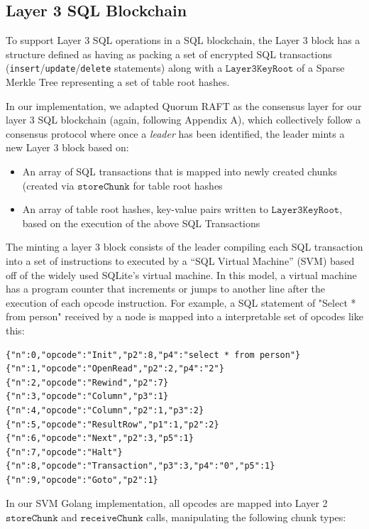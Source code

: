 \documentclass{article}
\begin{document}
\subsection{Layer 3 SQL Blockchain}

To support Layer 3 SQL operations in a SQL blockchain, the Layer 3 block has a  structure defined as having as packing a set of encrypted SQL transactions ({\tt insert}/{\tt update}/{\tt delete} statements)  along with a $\texttt{Layer3KeyRoot}$ of a Sparse Merkle Tree representing a set of table root hashes.

In our implementation, we adapted Quorum RAFT as the consensus layer for our layer 3 SQL blockchain (again, following Appendix A), which collectively follow a consensus protocol where once a {\em leader} has been identified, the leader mints a new Layer 3 block based on:
\begin{itemize}
\item An array of SQL transactions that is mapped into newly created chunks (created via $\texttt{storeChunk}$ for table root hashes
\item An array of table root hashes, key-value pairs written to $\texttt{Layer3KeyRoot}$, based on the execution of the above SQL Transactions
\end{itemize}
The minting a layer 3 block consists of the leader compiling each SQL transaction into a set of instructions to executed by a ``SQL Virtual Machine'' (SVM) based off of the widely used SQLite's virtual machine.  In this model, a virtual machine has a program counter that increments or jumps to another line after the execution of each opcode instruction.  For example, a SQL statement of "Select * from person" received by a node is mapped into a interpretable set of opcodes like this:
\begin{verbatim}
{"n":0,"opcode":"Init","p2":8,"p4":"select * from person"}
{"n":1,"opcode":"OpenRead","p2":2,"p4":"2"}
{"n":2,"opcode":"Rewind","p2":7}
{"n":3,"opcode":"Column","p3":1}
{"n":4,"opcode":"Column","p2":1,"p3":2}
{"n":5,"opcode":"ResultRow","p1":1,"p2":2}
{"n":6,"opcode":"Next","p2":3,"p5":1}
{"n":7,"opcode":"Halt"}
{"n":8,"opcode":"Transaction","p3":3,"p4":"0","p5":1}
{"n":9,"opcode":"Goto","p2":1}
\end{verbatim}
In our SVM Golang implementation, all opcodes are mapped into Layer 2 $\texttt{storeChunk}$ and  $\texttt{receiveChunk}$ calls, manipulating the following chunk types:
\end{document}
